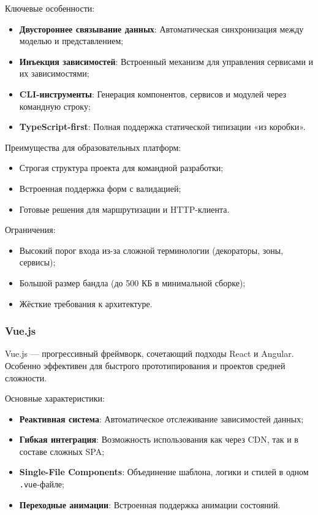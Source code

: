 Ключевые особенности:
\begin{itemize}
  \item \textbf{Двустороннее связывание данных}: Автоматическая синхронизация между моделью и представлением;
  \item \textbf{Инъекция зависимостей}: Встроенный механизм для управления сервисами и их зависимостями\cite{angular_dependency_injection};
  \item \textbf{CLI-инструменты}: Генерация компонентов, сервисов и модулей через командную строку;
  \item \textbf{TypeScript-first}: Полная поддержка статической типизации «из коробки».
\end{itemize}

Преимущества для образовательных платформ:
\begin{itemize}
  \item Строгая структура проекта для командной разработки;
  \item Встроенная поддержка форм с валидацией;
  \item Готовые решения для маршрутизации и HTTP-клиента.
\end{itemize}

Ограничения:
\begin{itemize}
  \item Высокий порог входа из-за сложной терминологии (декораторы, зоны, сервисы);
  \item Большой размер бандла (до 500 КБ в минимальной сборке);
  \item Жёсткие требования к архитектуре.
\end{itemize}

\subsubsection{Vue.js}
Vue.js — прогрессивный фреймворк, сочетающий подходы React и Angular\cite{vuejs_guide}. Особенно эффективен для быстрого прототипирования и проектов средней сложности.

Основные характеристики:
\begin{itemize}
  \item \textbf{Реактивная система}: Автоматическое отслеживание зависимостей данных;
  \item \textbf{Гибкая интеграция}: Возможность использования как через CDN, так и в составе сложных SPA;
  \item \textbf{Single-File Components}: Объединение шаблона, логики и стилей в одном \texttt{.vue}-файле;
  \item \textbf{Переходные анимации}: Встроенная поддержка анимации состояний.
\end{itemize}

